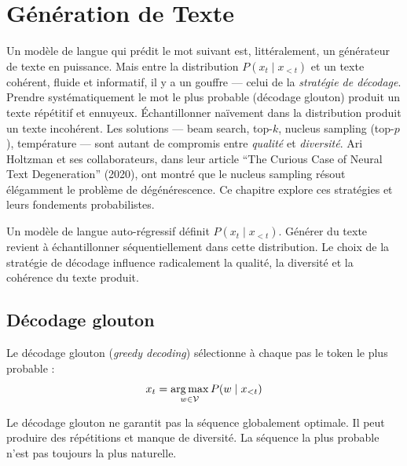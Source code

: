 \chapter{G\'en\'eration de Texte}
\label{ch:generation}

Un mod\`ele de langue qui pr\'edit le mot suivant est, litt\'eralement, un g\'en\'erateur de texte en puissance. Mais entre la distribution $P(x_t \mid x_{<t})$ et un texte coh\'erent, fluide et informatif, il y a un gouffre --- celui de la \emph{strat\'egie de d\'ecodage}. Prendre syst\'ematiquement le mot le plus probable (d\'ecodage glouton) produit un texte r\'ep\'etitif et ennuyeux. \'Echantillonner na\"ivement dans la distribution produit un texte incoh\'erent. Les solutions --- beam search, top-$k$, nucleus sampling (top-$p$), temp\'erature --- sont autant de compromis entre \emph{qualit\'e} et \emph{diversit\'e}. Ari Holtzman et ses collaborateurs, dans leur article ``The Curious Case of Neural Text Degeneration'' (2020), ont montr\'e que le nucleus sampling r\'esout \'el\'egamment le probl\`eme de d\'eg\'en\'erescence. Ce chapitre explore ces strat\'egies et leurs fondements probabilistes.

\begin{intuition}[title=\textbf{Du mod\`ele de langue au g\'en\'erateur}]
Un mod\`ele de langue auto-r\'egressif d\'efinit $P(x_t \mid x_{<t})$.
G\'en\'erer du texte revient \`a \'echantillonner s\'equentiellement dans cette
distribution. Le choix de la strat\'egie de d\'ecodage influence radicalement la
qualit\'e, la diversit\'e et la coh\'erence du texte produit.
\end{intuition}

\section{D\'ecodage glouton}
\label{sec:gen:greedy}

\begin{definition}
Le d\'ecodage glouton (\emph{greedy decoding}) s\'electionne \`a chaque pas
le token le plus probable :
\[
x_t = \operatorname*{arg\,max}_{w \in \mathcal{V}} P(w \mid x_{<t})
\]
\end{definition}

\begin{attention}[title=\textbf{Limites du d\'ecodage glouton}]
Le d\'ecodage glouton ne garantit pas la s\'equence globalement optimale. Il
peut produire des r\'ep\'etitions et manque de diversit\'e. La s\'equence la
plus probable n'est pas toujours la plus naturelle.
\end{attention}

